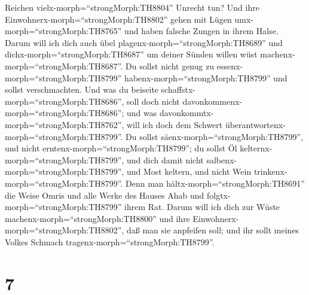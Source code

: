 Reichen vielx-morph=``strongMorph:TH8804'' Unrecht tun? Und ihre
Einwohnerx-morph=``strongMorph:TH8802'' gehen mit Lügen
umx-morph=``strongMorph:TH8765'' und haben falsche Zungen in ihrem
Halse.  Darum will ich dich auch übel
plagenx-morph=``strongMorph:TH8689'' und
dichx-morph=``strongMorph:TH8687'' um deiner Sünden willen wüst
machenx-morph=``strongMorph:TH8687''.  Du sollst nicht
genug zu essenx-morph=``strongMorph:TH8799''
habenx-morph=``strongMorph:TH8799'' und sollst verschmachten. Und was du
beiseite schaffstx-morph=``strongMorph:TH8686'', soll doch nicht
davonkommenx-morph=``strongMorph:TH8686''; und was
davonkommtx-morph=``strongMorph:TH8762'', will ich doch dem Schwert
überantwortenx-morph=``strongMorph:TH8799''.  Du sollst
säenx-morph=``strongMorph:TH8799'', und nicht
erntenx-morph=``strongMorph:TH8799''; du sollst Öl
kelternx-morph=``strongMorph:TH8799'', und dich damit nicht
salbenx-morph=``strongMorph:TH8799'', und Most keltern, und nicht Wein
trinkenx-morph=``strongMorph:TH8799''.  Denn man
hältx-morph=``strongMorph:TH8691'' die Weise Omris und alle Werke des
Hauses Ahab und folgtx-morph=``strongMorph:TH8799'' ihrem Rat. Darum
will ich dich zur Wüste machenx-morph=``strongMorph:TH8800'' und ihre
Einwohnerx-morph=``strongMorph:TH8802'', daß man sie anpfeifen soll; und
ihr sollt meines Volkes Schmach tragenx-morph=``strongMorph:TH8799''.

\hypertarget{section-6}{%
\section{7}\label{section-6}}

